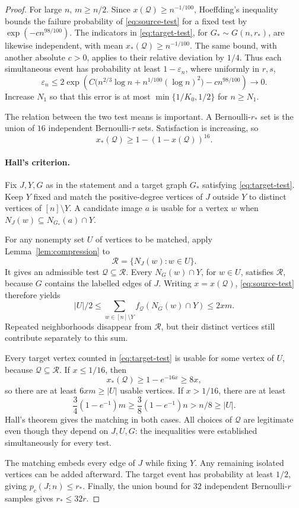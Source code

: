 \documentclass[11pt]{article}
\theoremstyle{remark}
\numberwithin{equation}{section}
\newcommand{\calQ}{\mathcal Q}
\newcommand{\calR}{\mathcal R}
\begin{document}
\begin{proof}
For large $n$, $m\geq n/2$. Since $x(\calQ)\geq n^{-1/100}$,
Hoeffding's inequality \cite{Hoeffding63} bounds the failure
probability of \eqref{eq:source-test} for a fixed test by
$\exp(-c n^{98/100})$. The indicators in
\eqref{eq:target-test}, for $G_*\sim G(n,r_*)$, are likewise
independent, with mean $x_*(\calQ)\geq n^{-1/100}$.
The same bound, with another absolute $c>0$, applies to their
relative deviation by $1/4$.
Thus each simultaneous event has probability at least
$1-\varepsilon_n$, where uniformly in $r,s$,
\begin{equation}\label{eq:uniform-error}
 \varepsilon_n\leq
 2\exp\!\left(
 C\bigl(n^{2/3}\log n+n^{1/100}(\log n)^2\bigr)
 -c n^{98/100}\right)\longrightarrow0.
\end{equation}
Increase $N_1$ so that this error is at most
$\min\{1/K_0,1/2\}$ for $n\geq N_1$.

The relation between the two test means is important. A
Bernoulli-$r_*$ set is the union of $16$ independent
Bernoulli-$\tau$ sets. Satisfaction is increasing, so
\begin{equation}\label{eq:amplification}
 x_*(\calQ)\geq1-(1-x(\calQ))^{16}.
\end{equation}

\paragraph{Hall's criterion.}
Fix $J,Y,G$ as in the statement and a target graph $G_*$
satisfying \eqref{eq:target-test}. Keep $Y$ fixed and match
the positive-degree vertices of $J$ outside $Y$ to distinct
vertices of $[n]\setminus Y$. A candidate image $a$ is usable
for a vertex $w$ when
$N_J(w)\subseteq N_{G_*}(a)\cap Y$.

For any nonempty set $U$ of vertices to be matched, apply
Lemma~\ref{lem:compression} to
\[
 \calR=\{N_J(w):w\in U\}.
\]
It gives an admissible test $\calQ\subseteq\calR$.
Every $N_G(w)\cap Y$, for $w\in U$, satisfies $\calR$,
because $G$ contains the labelled edges of $J$. Writing
$x=x(\calQ)$, \eqref{eq:source-test} therefore yields
\begin{equation}\label{eq:hall-source}
 |U|/2\leq\sum_{w\in[n]\setminus Y}
       f_{\calQ}(N_G(w)\cap Y)\leq2xm.
\end{equation}
Repeated neighborhoods disappear from $\calR$, but their
distinct vertices still contribute separately to this sum.

Every target vertex counted in \eqref{eq:target-test} is usable
for some vertex of $U$, because $\calQ\subseteq\calR$.
If $x\leq1/16$, then
\[
 x_*(\calQ)\geq1-e^{-16x}\geq8x,
\]
so there are at least $6xm\geq|U|$ usable vertices.
If $x>1/16$, there are at least
\[
 \frac34(1-e^{-1})m\geq\frac38(1-e^{-1})n>n/8\geq|U|.
\]
Hall's theorem \cite{Hall35} gives the matching in both cases.
All choices of $\calQ$ are legitimate even though they depend
on $J,U,G$: the inequalities were established simultaneously
for every test.

The matching embeds every edge of $J$ while fixing $Y$.
Any remaining isolated vertices can be added afterward. The
target event has probability at least $1/2$, giving
$p_c(J;n)\leq r_*$. Finally, the union bound for $32$ independent
Bernoulli-$r$ samples gives $r_*\leq32r$.
\end{proof}
\end{document}
